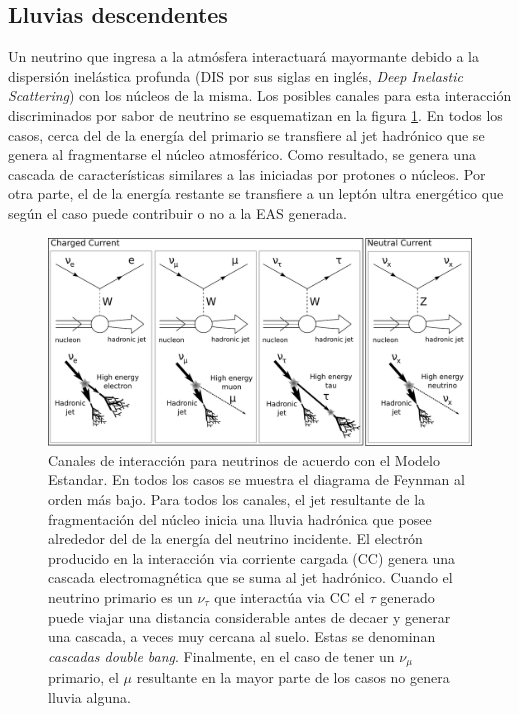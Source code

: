 \subsection{Lluvias descendentes}
\label{sbsc:easDG}

Un neutrino que ingresa a la atm\'osfera interactuar\'a mayormante debido a la dispersión inelástica profunda (DIS por sus siglas en inglés, \emph{Deep Inelastic Scattering}) con los n\'ucleos de la misma.
Los posibles canales para esta interacci\'on discriminados por sabor de neutrino se esquematizan en la figura \ref{fig:SM_nu_int}.
En todos los casos, cerca del  de la energía del primario se transfiere al jet hadrónico que se genera al fragmentarse el n\'ucleo atmosf\'erico.
Como resultado, se genera una cascada de características similares a las iniciadas por protones o núcleos.
Por otra parte, el  de la energ\'ia restante se transfiere a un leptón ultra energético que según el caso puede contribuir o no a la EAS generada.
%
\begin{figure}[ht]
\begin{center}
\includegraphics[width=1.0\textwidth]{fig/EASAuger/nu_channels_english.pdf}
\caption{Canales de interacción para neutrinos de acuerdo con el Modelo Estandar.
En todos los casos se muestra el diagrama de Feynman al orden más bajo.
Para todos los canales, el jet resultante de la fragmentación del núcleo inicia una lluvia hadrónica que posee alrededor del  de la energía del neutrino incidente.
El electrón producido en la interacción via corriente cargada (CC) genera una cascada electromagnética que se suma al jet hadrónico.
Cuando el neutrino primario es un $\nu_{\tau}$ que interact\'ua via CC el $\tau$ generado puede viajar una distancia considerable antes de decaer y generar una cascada, a veces muy cercana al suelo.
Estas se denominan \emph{cascadas double bang}.
Finalmente, en el caso de tener un $\nu_{\mu}$ primario, el $\mu$ resultante en la mayor parte de los casos no genera lluvia alguna.
}
\label{fig:SM_nu_int}
\end{center}
\end{figure}

